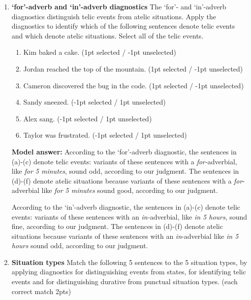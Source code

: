 \documentclass[a4,11pt]{article}
\newcommand{\6}{\mbox{$[\hspace*{-.6mm}[$}}
\newcommand{\9}{\mbox{$]\hspace*{-.6mm}]$}}
\begin{document}
\begin{enumerate}[leftmargin = 12pt]
{\bf Model answer:} According to the progressive diagnostic, the sentences in (a)-(c) denote events because the progressive variants of these sentences (i.e., {\em Kim was building a house, Sandy was sneezing, Alex was walking}) are acceptable, according to our judgment. The sentence in (d) denotes a state because its progressive version (i.e., {\em Taylor was being frustrated}) sounds odd, according to our judgment.

\item {\bf `for'-adverb and `in'-adverb diagnostics} The `for'- and `in'-adverb diagnostics distinguish telic events from atelic situations. Apply the diagnostics to identify which of the following sentences denote telic events and which denote atelic situations. Select all of the telic events.

\begin{enumerate}[noitemsep]
\item Kim baked a cake. (1pt selected /  -1pt unselected)
\item Jordan reached the top of the mountain. (1pt selected /  -1pt unselected)
\item Cameron discovered the bug in the code. (1pt selected /  -1pt unselected)
\item Sandy sneezed. (-1pt selected /  1pt unselected)
\item Alex sang. (-1pt selected /  1pt unselected)
\item Taylor was frustrated. (-1pt selected /  1pt unselected)
\end{enumerate}

{\bf Model answer:} According to the `for'-adverb diagnostic, the sentences in (a)-(c) denote telic events: variants of these sentences with a {\em for-}adverbial, like {\em for 5 minutes}, sound odd, according to our judgment.  The sentences in (d)-(f) denote atelic situations because variants of these sentences with a {\em for}-adverbial like {\em for 5 minutes} sound good, according to our judgment. 

According to the `in'-adverb diagnostic, the sentences in (a)-(c) denote telic events: variants of these sentences with an {\em in-}adverbial, like {\em in 5 hours}, sound fine, according to our judgment.  The sentences in (d)-(f) denote atelic situations because variants of these sentences with an {\em in}-adverbial like {\em in 5 hours} sound odd, according to our judgment. 

\item { \bf Situation types} Match the following 5 sentences to the 5 situation types, by applying diagnostics for distinguishing events from states, for identifying telic events and for distinguishing durative from punctual situation types. (each correct match 2pts)


\end{enumerate}
\end{document}
